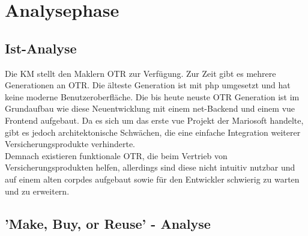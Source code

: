 \section{Analysephase}
\label{analysephase}

\subsection{Ist-Analyse}
\label{ist}
\begin{comment}
evtl alte otrs mit nutzwertanalyse vergleichen?
\end{comment}
Die \ac{KM} stellt den Maklern \ac{OTR} zur Verfügung. Zur Zeit gibt es mehrere Generationen an \ac{OTR}. Die älteste Generation ist mit \gls{php} umgesetzt und hat keine moderne Benutzeroberfläche. Die bis heute neuste \ac{OTR} Generation ist im Grundaufbau wie diese Neuentwicklung mit einem \gls{net}-Backend und einem \gls{vue} Frontend aufgebaut. Da es sich um das erste \gls{vue} Projekt der Mariosoft handelte, gibt es jedoch architektonische Schwächen, die eine einfache Integration weiterer Versicherungsprodukte verhinderte. \\
Demnach existieren funktionale \ac{OTR}, die beim Vertrieb von Versicherungsprodukten helfen, allerdings sind diese nicht intuitiv nutzbar und auf einem alten \gls{corpdes} aufgebaut sowie für den Entwickler schwierig zu warten und zu erweitern.

\subsection{'Make, Buy, or Reuse' - Analyse}
\label{makeOrBuy}


